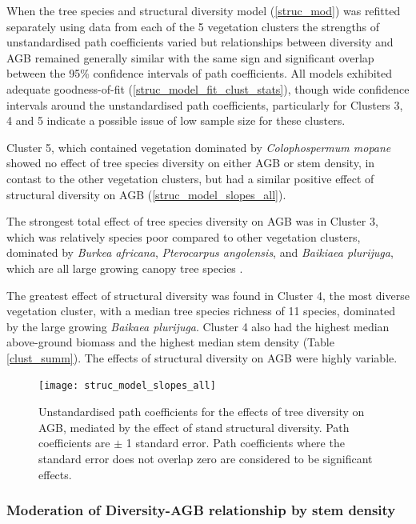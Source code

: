 \documentclass[11pt,a4paper]{article}
\begin{document}
When the tree species and structural diversity model (\autoref{struc_mod}) was refitted separately using data from each of the 5 vegetation clusters the strengths of unstandardised path coefficients varied but relationships between diversity and AGB remained generally similar with the same sign and significant overlap between the 95\% confidence intervals of path coefficients. All models exhibited adequate goodness-of-fit (\autoref{struc_model_fit_clust_stats}), though wide confidence intervals around the unstandardised path coefficients, particularly for Clusters 3, 4 and 5 indicate a possible issue of low sample size for these clusters.

Cluster 5, which contained vegetation dominated by \textit{Colophospermum mopane} showed no effect of tree species diversity on either AGB or stem density, in contast to the other vegetation clusters, but had a similar positive effect of structural diversity on AGB (\autoref{struc_model_slopes_all}).

The strongest total effect of tree species diversity on AGB was in Cluster 3, which was relatively species poor compared to other vegetation clusters, dominated by \textit{Burkea africana}, \textit{Pterocarpus angolensis}, and \textit{Baikiaea plurijuga}, which are all large growing canopy tree species \citep{}.

The greatest effect of structural diversity was found in Cluster 4, the most diverse vegetation cluster, with a median tree species richness of 11 species, dominated by the large growing \textit{Baikaea plurijuga}. Cluster 4 also had the highest median above-ground biomass and the highest median stem density (Table \autoref{clust_summ}). The effects of structural diversity on AGB were highly variable.

\begin{figure}[H]
\centering
	\texttt{[image: struc\_model\_slopes\_all]}
	\caption{Unstandardised path coefficients for the effects of tree diversity on AGB, mediated by the effect of stand structural diversity. Path coefficients are $\pm$ 1 standard error. Path coefficients where the standard error does not overlap zero are considered to be significant effects.}
	\label{struc_model_slopes_all}
\end{figure}




\subsubsection{Moderation of Diversity-AGB relationship by stem density}
\end{document}
